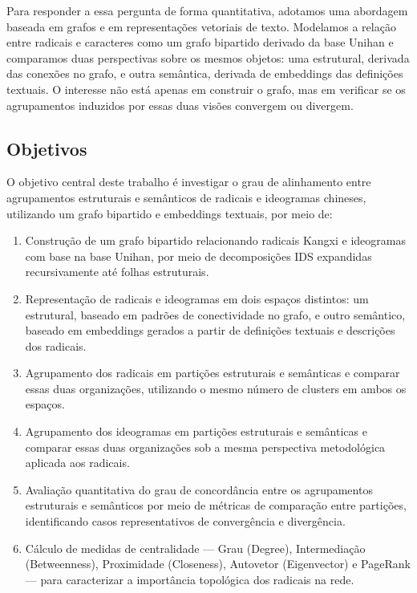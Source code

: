 \documentclass[10pt, a4paper, titlepage]{extarticle}
\begin{document}
Para responder a essa pergunta de forma quantitativa, adotamos uma abordagem baseada em grafos e em representações vetoriais de texto. Modelamos a relação entre radicais e caracteres como um grafo bipartido derivado da base Unihan e comparamos duas perspectivas sobre os mesmos objetos: uma estrutural, derivada das conexões no grafo, e outra semântica, derivada de embeddings das definições textuais. O interesse não está apenas em construir o grafo, mas em verificar se os agrupamentos induzidos por essas duas visões convergem ou divergem.

\subsection{Objetivos}
O objetivo central deste trabalho é investigar o grau de alinhamento entre agrupamentos estruturais e semânticos de radicais e ideogramas chineses, utilizando um grafo bipartido e embeddings textuais, por meio de:

\begin{enumerate}
    \item Construção de um grafo bipartido relacionando radicais Kangxi e ideogramas com base na base Unihan, por meio de decomposições IDS expandidas recursivamente até folhas estruturais.
    \item Representação de radicais e ideogramas em dois espaços distintos: um estrutural, baseado em padrões de conectividade no grafo, e outro semântico, baseado em embeddings gerados a partir de definições textuais e descrições dos radicais.
    \item Agrupamento dos radicais em partições estruturais e semânticas e comparar essas duas organizações, utilizando o mesmo número de clusters em ambos os espaços.
    \item Agrupamento dos ideogramas em partições estruturais e semânticas e comparar essas duas organizações sob a mesma perspectiva metodológica aplicada aos radicais.
    \item Avaliação quantitativa do grau de concordância entre os agrupamentos estruturais e semânticos por meio de métricas de comparação entre partições, identificando casos representativos de convergência e divergência.
    \item Cálculo de medidas de centralidade --- Grau (Degree), Intermediação (Betweenness), Proximidade (Closeness), Autovetor (Eigenvector) e PageRank --- para caracterizar a importância topológica dos radicais na rede.

\end{enumerate}
\end{document}
